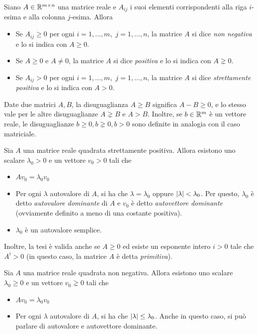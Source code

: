 \begin{defi}
Siano $A \in \mathbb{R}^{m \times n}$ una matrice reale e $A_{ij}$ i suoi elementi
corrispondenti alla riga $i$-esima e alla colonna $j$-esima. Allora
\begin{itemize}
\item Se $A_{ij} \geq 0$ per ogni $i = 1,\dots,m$, $\,j = 1,\dots,n$,
	la matrice $A$ si dice \emph{non negativa} e lo si indica con $A \geq 0$.
\item Se $A \geq 0$ e $A \neq 0$, la matrice $A$ si dice \emph{positiva}
	e lo si indica con $A \gneq 0$.
\item Se $A_{ij} > 0$ per ogni $i = 1,\dots,m$, $\,j = 1,\dots,n$,
	la matrice $A$ si dice \emph{strettamente positiva} e lo si indica con $A > 0$.
\end{itemize}
Date due matrici $A,B$, la disuguaglianza $A \geq B$ significa $A-B \geq 0$,
e lo stesso vale per le altre disuguaglianze $A \gneq B$ e $A > B$.
Inoltre, se $b \in \mathbb{R}^m$ è un vettore reale, le disuguaglianze
$b \geq 0, b \gneq 0, b > 0$ sono definite in analogia con il caso matriciale.
\end{defi}

\begin{teor}
Sia $A$ una matrice reale quadrata strettamente positiva. Allora esistono uno scalare
$\lambda_0 > 0$ e un vettore $v_0 > 0$ tali che
\begin{itemize}
\item $A v_0 = \lambda_0 v_0$
\item Per ogni $\lambda$ autovalore di $A$, si ha che $\lambda = \lambda_0$
	oppure $\left\lvert\lambda\right\rvert < \lambda_0$. Per questo, $\lambda_0$ è detto
	\emph{autovalore dominante} di $A$ e $v_0$ è detto \emph{autovettore dominante}
	(ovviamente definito a meno di una costante positiva).
\item $\lambda_0$ è un autovalore semplice.
\end{itemize}
Inoltre, la tesi è valida anche se $A \geq 0$ ed esiste un esponente intero
$i > 0$ tale che $A^i > 0$ (in questo caso, la matrice $A$ è detta \emph{primitiva}).
\end{teor}

\begin{teor}
Sia $A$ una matrice reale quadrata non negativa. Allora esistono uno scalare
$\lambda_0 \geq 0$ e un vettore $v_0 \gneq 0$ tali che
\begin{itemize}
\item $A v_0 = \lambda_0 v_0$
\item Per ogni $\lambda$ autovalore di $A$, si ha che $\left\lvert\lambda\right\rvert \leq \lambda_0$.
	Anche in questo caso, si può parlare di autovalore e autovettore dominante.
\end{itemize}
\end{teor}

